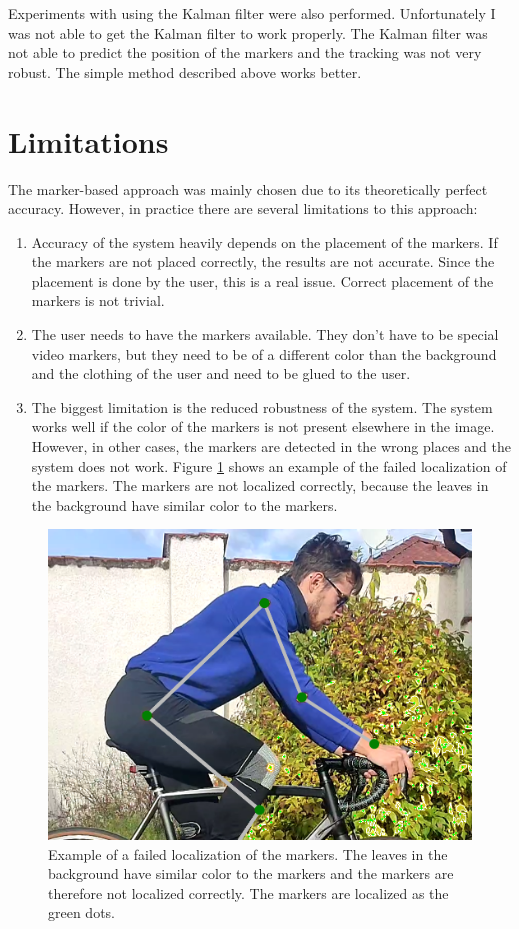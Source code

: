 Experiments with using the Kalman filter were also performed. Unfortunately I was not able to get the Kalman filter to work properly. The Kalman filter was not able to predict the position of the markers and the tracking was not very robust. The simple method described above works better.

\section{Limitations}
The marker-based approach was mainly chosen due to its theoretically perfect accuracy. However, in practice there are several limitations to this approach:

\begin{enumerate}
    \item Accuracy of the system heavily depends on the placement of the markers. If the markers are not placed correctly, the results are not accurate. Since the placement is done by the user, this is a real issue. Correct placement of the markers is not trivial.
    \item The user needs to have the markers available. They don't have to be special video markers, but they need to be of a different color than the background and the clothing of the user and need to be glued to the user.
    \item The biggest limitation is the reduced robustness of the system. The system works well if the color of the markers is not present elsewhere in the image. However, in other cases, the markers are detected in the wrong places and the system does not work. Figure \ref{fig:failed_localization} shows an example of the failed localization of the markers. The markers are not localized correctly, because the leaves in the background have similar color to the markers.
\end{enumerate}

\begin{figure}[htbp]
    \centering
    \includegraphics[width=\textwidth]{obrazky-figures/failed_localization_crop.png}
    \caption{Example of a failed localization of the markers. The leaves in the background have similar color to the markers and the markers are therefore not localized correctly. The markers are localized as the green dots.}
    \label{fig:failed_localization}
\end{figure}


